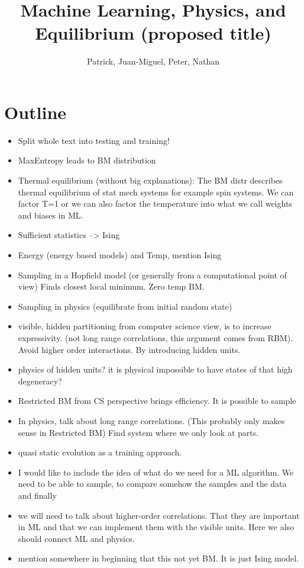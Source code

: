 \documentclass[nofootinbib, superscriptaddress, prl]{revtex4}
\begin{document}
\title{Machine Learning, Physics, and Equilibrium (proposed title)}
\author{Patrick, Juan-Miguel, Peter, Nathan}
\maketitle

\section{Outline}

\begin{itemize}
\item Split whole text into testing and training!
\item MaxEntropy leads to BM distribution
\item Thermal equilibrium (without big explanations): The BM distr describes thermal equilibrium of stat mech systems for example spin systems.
We can factor T=1 or we can also factor the temperature into what we call weights and biases in ML.
\item Sufficient statistics --> Ising
\item Energy (energy based models) and Temp, mention Ising
\item Sampling in a Hopfield model (or generally from a computational point of view) Finds closest local minimum. Zero temp BM.
\item Sampling in physics (equilibrate from initial random state)
\item visible, hidden partitioning from computer science view, is to increase expressivity.
(not long range correlations, this argument comes from RBM). Avoid higher order interactions. By introducing hidden units.
\item physics of hidden units? it is physical impossible to have states of that high degeneracy?
\item Restricted BM from CS perspective brings efficiency. It is possible to sample
\item In physics, talk about long range correlations. (This probably only makes sense in Restricted BM)
Find system where we only look at parts.
\item quasi static evolution as a training approach.
\item I would like to include the idea of what do we need for a ML algorithm. We need to be able to sample, to compare somehow the samples and the data and finally 
\item we will need to talk about higher-order correlations. That they are important in ML and that we can implement them with the visible units. Here we also should connect ML and physics.
\item mention somewhere in beginning that this not yet BM. It is just Ising model.
\end{itemize}
\end{document}

